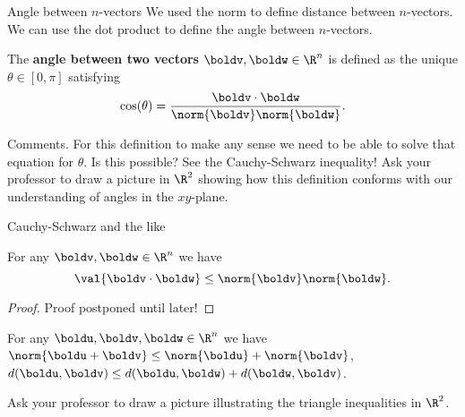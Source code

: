 \begin{frame}{Angle between $n$-vectors}
We used the norm to define distance between $n$-vectors. We can use the dot product to define the angle between $n$-vectors.
\pause\begin{definition}
The {\bf angle between two vectors} $\boldv, \boldw\in\R^n$ is defined as the unique $\theta\in[0,\pi]$ satisfying 
\[
\cos(\theta)=\frac{\boldv\cdot\boldw}{\norm{\boldv}\norm{\boldw}}.
\]
\end{definition}
\pause
\alert{Comments.}
\bb
\ii For this definition to make any sense we need to be able to solve that equation for $\theta$. Is this possible? See the \alert{Cauchy-Schwarz inequality}!
\pause\ii Ask your professor to draw a picture in $\R^2$ showing how this definition conforms with our understanding of angles in the $xy$-plane. 
\ee
\end{frame}
\begin{frame}{Cauchy-Schwarz and the like}
\begin{theorem}
For any $\boldv,\boldw\in\R^n$ we have 
\[
\val{\boldv\cdot\boldw}\leq\norm{\boldv}\norm{\boldw}.
\]
\end{theorem}
\pause
\begin{proof}
Proof postponed until later!
\end{proof}
\pause
\begin{corollary}
For any $\boldu, \boldv, \boldw\in\R^n$ we have 
\bb[(1)]
\ii $\norm{\boldu+\boldv}\leq\norm{\boldu}+\norm{\boldv}$,
\ii $d(\boldu,\boldv)\leq d(\boldu,\boldw)+d(\boldw,\boldv)$.
\ee
\end{corollary}
\pause Ask your professor to draw a picture illustrating the triangle inequalities in $\R^2$. 
\end{frame}